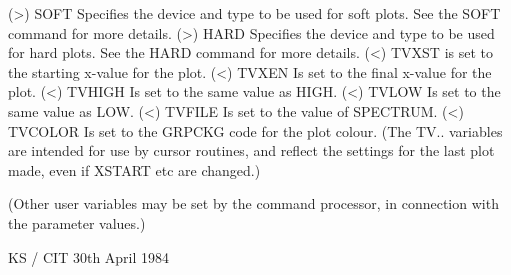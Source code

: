 \begin{description}
\begin{terminalv}
 (>) SOFT    Specifies the device and type to be used for soft
             plots.  See the SOFT command for more details.
 (>) HARD    Specifies the device and type to be used for hard
             plots.  See the HARD command for more details.
 (<) TVXST   is set to the starting x-value for the plot.
 (<) TVXEN   Is set to the final x-value for the plot.
 (<) TVHIGH  Is set to the same value as HIGH.
 (<) TVLOW   Is set to the same value as LOW.
 (<) TVFILE  Is set to the value of SPECTRUM.
 (<) TVCOLOR Is set to the GRPCKG code for the plot colour.
             (The TV.. variables are intended for use by
             cursor routines, and reflect the settings for the
             last plot made, even if XSTART etc are changed.)

 (Other user variables may be set by the command processor, in
 connection with the parameter values.)

                                     KS / CIT  30th April 1984
\end{terminalv}
\end{description}
